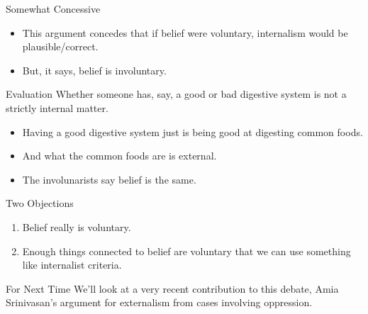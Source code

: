 \documentclass[
  17pt,
  letterpaper,
  ignorenonframetext,
  aspectratio=169,
]{beamer}
\providecommand{\tightlist}{%
  \setlength{\itemsep}{0pt}\setlength{\parskip}{0pt}}\usepackage{longtable,booktabs,array}
\begin{document}
\begin{frame}{Somewhat Concessive}
\protect\hypertarget{somewhat-concessive}{}
\begin{itemize}[<+->]
\tightlist
\item
  This argument concedes that if belief were voluntary, internalism
  would be plausible/correct.
\item
  But, it says, belief is involuntary.
\end{itemize}
\end{frame}

\begin{frame}{Evaluation}
\protect\hypertarget{evaluation}{}
Whether someone has, say, a good or bad digestive system is not a
strictly internal matter.

\begin{itemize}[<+->]
\tightlist
\item
  Having a good digestive system just is being good at digesting common
  foods.
\item
  And what the common foods are is external.
\item
  The involunarists say belief is the same.
\end{itemize}
\end{frame}

\begin{frame}{Two Objections}
\protect\hypertarget{two-objections}{}
\begin{enumerate}[<+->]
\tightlist
\item
  Belief really is voluntary.
\item
  Enough things connected to belief are voluntary that we can use
  something like internalist criteria.
\end{enumerate}
\end{frame}

\begin{frame}{For Next Time}
\protect\hypertarget{for-next-time}{}
We'll look at a very recent contribution to this debate, Amia
Srinivasan's argument for externalism from cases involving oppression.
\end{frame}
\end{document}
